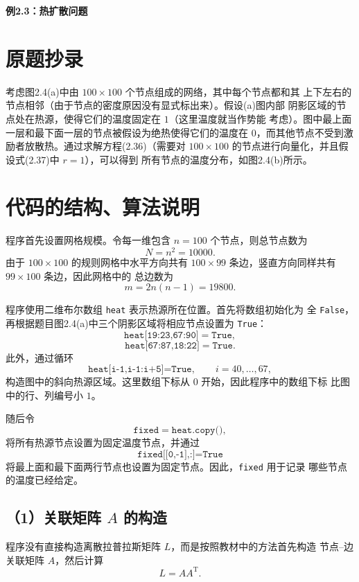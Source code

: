 \documentclass[UTF8,a4paper,11pt,fontset=fandol]{ctexart}
\begin{document}
\pagestyle{plain}

\begin{center}
  {\Large\bfseries 例2.3：热扩散问题}
\end{center}

\section{原题抄录}

考虑图2.4(a)中由 $100\times100$ 个节点组成的网络，其中每个节点都和其
上下左右的节点相邻（由于节点的密度原因没有显式标出来）。假设(a)图内部
阴影区域的节点处在热源，使得它们的温度固定在 $1$（这里温度就当作势能
考虑）。图中最上面一层和最下面一层的节点被假设为绝热使得它们的温度在
$0$，而其他节点不受到激励者放散热。通过求解方程(2.36)（需要对
$100\times100$ 的节点进行向量化，并且假设式(2.37)中 $r=1$），可以得到
所有节点的温度分布，如图2.4(b)所示。


\section{代码的结构、算法说明}

程序首先设置网格规模。令每一维包含 $n=100$ 个节点，则总节点数为
\[
N=n^2=10000.
\]
由于 $100\times100$ 的规则网格中水平方向共有
$100\times99$ 条边，竖直方向同样共有 $99\times100$ 条边，因此网格中的
总边数为
\[
m=2n(n-1)=19800.
\]

程序使用二维布尔数组 \texttt{heat} 表示热源所在位置。首先将数组初始化为
全 \texttt{False}，再根据题目图2.4(a)中三个阴影区域将相应节点设置为
\texttt{True}：
\[
\texttt{heat[19:23,67:90]}=\texttt{True},
\]
\[
\texttt{heat[67:87,18:22]}=\texttt{True}.
\]
此外，通过循环
\[
\texttt{heat[i-1,i-1:i+5]=True},
\qquad i=40,\ldots,67,
\]
构造图中的斜向热源区域。这里数组下标从 $0$ 开始，因此程序中的数组下标
比图中的行、列编号小 $1$。

随后令
\[
\texttt{fixed}=\texttt{heat.copy()},
\]
将所有热源节点设置为固定温度节点，并通过
\[
\texttt{fixed[[0,-1],:]=True}
\]
将最上面和最下面两行节点也设置为固定节点。因此，\texttt{fixed} 用于记录
哪些节点的温度已经给定。


\subsection*{（1）关联矩阵 $A$ 的构造}

程序没有直接构造离散拉普拉斯矩阵 $L$，而是按照教材中的方法首先构造
节点--边关联矩阵 $A$，然后计算
\[
\boxed{L=AA^{\mathrm T}}.
\]
\end{document}
